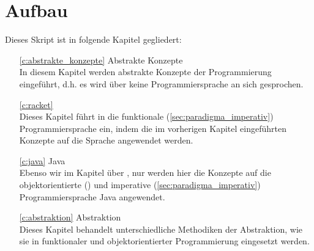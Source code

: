 
\section{Aufbau}
	Dieses Skript ist in folgende Kapitel gegliedert:
	\begin{itemize}
		\item[\ref{c:abstrakte_konzepte}] Abstrakte Konzepte \\ In diesem Kapitel werden abstrakte Konzepte der Programmierung eingeführt, d.h. es wird über keine Programmiersprache an sich gesprochen.
		\item[\ref{c:racket}] \racket \\ Dieses Kapitel führt in die funktionale (\ref{sec:paradigma_imperativ}) Programmiersprache \racket ein, indem die im vorherigen Kapitel eingeführten Konzepte auf die Sprache angewendet werden.
		\item[\ref{c:java}] Java \\ Ebenso wir im Kapitel über \racket, nur werden hier die Konzepte auf die objektorientierte () und imperative (\ref{sec:paradigma_imperativ}) Programmiersprache Java angewendet.
		\item[\ref{c:abstraktion}] Abstraktion \\ Dieses Kapitel behandelt unterschiedliche Methodiken der Abstraktion, wie sie in funktionaler und objektorientierter Programmierung eingesetzt werden.
	\end{itemize}
